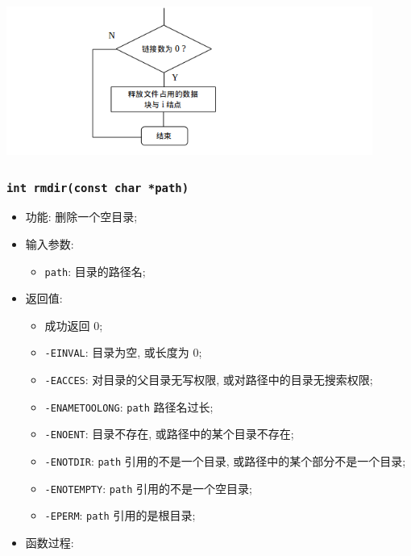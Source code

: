 \documentclass[nofonts]{ctexart}
\begin{document}
\begin{itemize}
  \includegraphics[width=12cm]{./images/./unlink_2.png}
  \end{itemize}
  \subsubsection[\texttt{rmdir}]{\texttt{int rmdir(const char *path)}}
  \begin{itemize}
\item
  功能: 删除一个空目录;
\item
  输入参数:

  \begin{itemize}
  \item
    \texttt{path}: 目录的路径名;
  \end{itemize}
\item
  返回值:

  \begin{itemize}
  \item
    成功返回 0;
  \item
    \texttt{-EINVAL}: 目录为空, 或长度为 0;
  \item
    \texttt{-EACCES}: 对目录的父目录无写权限,
    或对路径中的目录无搜索权限;
  \item
    \texttt{-ENAMETOOLONG}: \texttt{path} 路径名过长;
  \item
    \texttt{-ENOENT}: 目录不存在, 或路径中的某个目录不存在;
  \item
    \texttt{-ENOTDIR}: \texttt{path} 引用的不是一个目录,
    或路径中的某个部分不是一个目录;
  \item
    \texttt{-ENOTEMPTY}: \texttt{path} 引用的不是一个空目录;
  \item
    \texttt{-EPERM}: \texttt{path} 引用的是根目录;
  \end{itemize}
\item
  函数过程:


\end{itemize}
\end{document}
